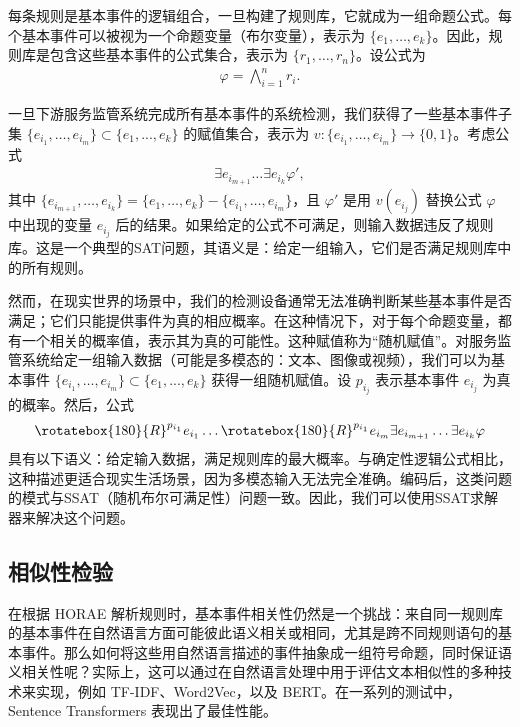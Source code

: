 每条规则是基本事件的逻辑组合，一旦构建了规则库，它就成为一组命题公式。每个基本事件可以被视为一个命题变量（布尔变量），表示为 $\{e_1, \dots, e_k\}$。因此，规则库是包含这些基本事件的公式集合，表示为 $\{r_1, \dots, r_n\}$。设公式为
\begin{align*}
\varphi = \bigwedge_{i=1}^{n} r_i.
\end{align*}

一旦下游服务监管系统完成所有基本事件的系统检测，我们获得了一些基本事件子集 $\{e_{i_1}, \dots, e_{i_m}\} \subset \{e_1, ..., e_k\}$ 的赋值集合，表示为 $v: \{e_{i_1}, \dots, e_{i_m}\} \to \{0,1\}$。考虑公式
\begin{align*}
\exists e_{i_{m+1}} \dots \exists e_{i_{k}} \varphi',
\end{align*}
其中 $\{e_{i_{m+1}},\dots,e_{i_{k}}\}=\{e_1,\dots,e_k\} - \{e_{i_1}, \dots, e_{i_m}\}$，且 $\varphi'$ 是用 $v(e_{i_j})$ 替换公式 $\varphi$ 中出现的变量 $e_{i_j}$ 后的结果。如果给定的公式不可满足，则输入数据违反了规则库。这是一个典型的SAT问题，其语义是：给定一组输入，它们是否满足规则库中的所有规则。

然而，在现实世界的场景中，我们的检测设备通常无法准确判断某些基本事件是否满足；它们只能提供事件为真的相应概率。在这种情况下，对于每个命题变量，都有一个相关的概率值，表示其为真的可能性。这种赋值称为“随机赋值”。对服务监管系统给定一组输入数据（可能是多模态的：文本、图像或视频），我们可以为基本事件 $\{e_{i_1}, \dots, e_{i_m}\} \subset \{e_1, ..., e_k\}$ 获得一组随机赋值。设 $p_{i_j}$ 表示基本事件 $e_{i_j}$ 为真的概率。然后，公式
\begin{align*}
    \rotatebox{180}{R}^{p_{i_1}} e_{i_1} \dots \rotatebox{180}{R}^{p_{i_1}} e_{i_m}
    \exists e_{i_{m+1}} \dots \exists e_{i_k}
    \varphi
\end{align*}
具有以下语义：给定输入数据，满足规则库的最大概率。与确定性逻辑公式相比，这种描述更适合现实生活场景，因为多模态输入无法完全准确。编码后，这类问题的模式与SSAT（随机布尔可满足性）问题一致。因此，我们可以使用SSAT求解器来解决这个问题。

\subsection{相似性检验}

在根据 HORAE 解析规则时，基本事件相关性仍然是一个挑战：来自同一规则库 的基本事件在自然语言方面可能彼此语义相关或相同，尤其是跨不同规则语句的基本事件。那么如何将这些用自然语言描述的事件抽象成一组符号命题，同时保证语义相关性呢？实际上，这可以通过在自然语言处理中用于评估文本相似性的多种技术来实现，例如 TF-IDF、Word2Vec，以及 BERT。在一系列的测试中，Sentence Transformers 表现出了最佳性能。

